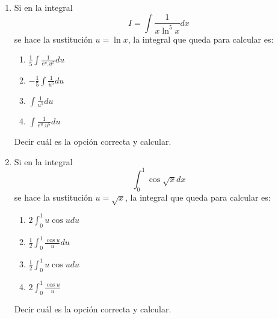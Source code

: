 \documentclass[12pt]{article}
\begin{document}
\begin{enumerate}
\item  
Si en la integral
\begin{equation*}
I =\int \frac{1}{x\ln^5x}dx
\end{equation*} 
se hace la sustitución $u = \ln x$, la integral que queda para calcular es:
\begin{enumerate}
\item $\frac{1}{5}\int \frac{1}{e^u.u^5}du$ 
\item $-\frac{1}{5}\int \frac{1}{u^5}du$ 
\item $\int \frac{1}{u^5}du$
\item $\int \frac{1}{e^u.u^5}du$
 \end{enumerate}
Decir cuál es la opción correcta y calcular.

\item  
Si en la integral
\begin{equation*}
\int_{0}^{1} \cos{\sqrt{x}}dx
\end{equation*} 
se hace la sustitución $u = \sqrt{x}$, la integral que queda para calcular es:
\begin{enumerate}
\item $2\int_{0}^{1} u\cos u du$ 
\item $\frac{1}{2}\int_{0}^{1} \frac{\cos u }{u} du$
\item $\frac{1}{2}\int_{0}^{1} u\cos u du$
\item $2 \int_{0}^{1} \frac{\cos u }{u} $
 \end{enumerate}
Decir cuál es la opción correcta y calcular.
\end{enumerate}
\end{document}
